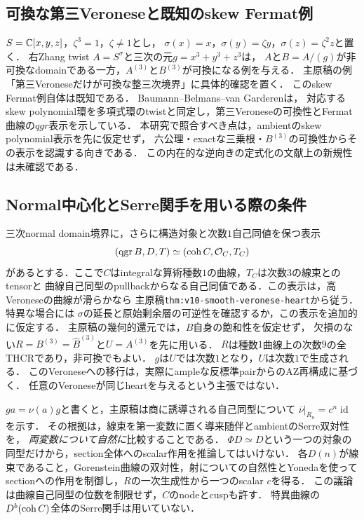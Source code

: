 \documentclass[11pt,a4paper]{ltjsarticle}
\begin{document}
\subsection{可換な第三Veroneseと既知のskew Fermat例}
$S=\mathbb C[x,y,z]$，$\zeta^3=1$，$\zeta\ne1$とし，
$\sigma(x)=x$，$\sigma(y)=\zeta y$，$\sigma(z)=\zeta^2z$と置く．
右Zhang twist $A=S^\sigma$と三次の元$g=x^3+y^3+z^3$は，
$A$と$B=A/(g)$が非可換なdomainである一方，$A^{(3)}$と$B^{(3)}$が可換になる例を与える．
主原稿の例「第三Veroneseだけが可換な整三次境界」に具体的確認を置く．
このskew Fermat例自体は既知である．
Baumann--Belmans--van Garderen\cite[\S6.1, Proposition 50, Lemma 52]{BBvGCentral}は，
対応するskew polynomial環を多項式環のtwistと同定し，第三Veroneseの可換性とFermat曲線の$qgr$表示を示している．
本研究で照合すべき点は，ambientのskew polynomial表示を先に仮定せず，
六公理・exactな三乗根・$B^{(3)}$の可換性からその表示を認識する向きである．
この内在的な逆向きの定式化の文献上の新規性は未確認である．

\subsection{Normal中心化とSerre関手を用いる際の条件}\label{subsec:v7-centralization-notes}

三次normal domain境界に，さらに構造対象と次数$1$自己同値を保つ表示
\[
 (\operatorname{qgr} B,D,T)\simeq(\operatorname{coh} C,\mathcal O_C,T_C)
\]
があるとする．ここで$C$はintegralな算術種数$1$の曲線，$T_C$は次数$3$の線束とのtensorと
曲線自己同型のpullbackからなる自己同値である．この表示は，高Veroneseの曲線が滑らかなら
主原稿\texttt{thm:v10-smooth-veronese-heart}から従う．特異な場合には
$\sigma$の延長と原始剰余層の可逆性を確認するか，この表示を追加的に仮定する．
主原稿の幾何的還元では，$B$自身の飽和性を仮定せず，
欠損のない$R=B^{(3)}=\widehat B^{(3)}$と$U=A^{(3)}$を先に用いる．
$R$は種数$1$曲線上の次数$9$の全THCRであり，非可換でもよい．
$g$は$U$では次数$1$となり，$U$は次数$1$で生成される．
このVeroneseへの移行は，実際にampleな反標準pairからのAZ再構成に基づく．
任意のVeroneseが同じheartを与えるという主張ではない．

$ga=\nu(a)g$と書くと，主原稿は商に誘導される自己同型について
$\overline\nu|_{R_n}=c^n\operatorname{id}$を示す．
その根拠は，線束を第一変数に置く導来随伴とambientのSerre双対性を，
\emph{両変数について自然に}比較することである．
$\Phi D\simeq D$という一つの対象の同型だけから，section全体へのscalar作用を推論してはいけない．
各$D(n)$が線束であること，Gorenstein曲線の双対性，射についての自然性とYonedaを使って
sectionへの作用を制御し，$R$の一次生成性から一つのscalar $c$を得る．
この議論は曲線自己同型の位数を制限せず，$C$のnodeとcuspも許す．
特異曲線の$D^b(\operatorname{coh} C)$全体のSerre関手は用いていない．
\end{document}
